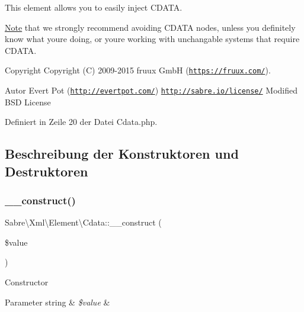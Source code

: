 This element allows you to easily inject C\+D\+A\+TA.

\mbox{\hyperlink{class_note}{Note}} that we strongly recommend avoiding C\+D\+A\+TA nodes, unless you definitely know what you\textquotesingle{}re doing, or you\textquotesingle{}re working with unchangable systems that require C\+D\+A\+TA.

\begin{DoxyCopyright}{Copyright}
Copyright (C) 2009-\/2015 fruux GmbH (\href{https://fruux.com/}{\tt https\+://fruux.\+com/}). 
\end{DoxyCopyright}
\begin{DoxyAuthor}{Autor}
Evert Pot (\href{http://evertpot.com/}{\tt http\+://evertpot.\+com/})  \href{http://sabre.io/license/}{\tt http\+://sabre.\+io/license/} Modified B\+SD License 
\end{DoxyAuthor}


Definiert in Zeile 20 der Datei Cdata.\+php.



\subsection{Beschreibung der Konstruktoren und Destruktoren}
\mbox{\label{class_sabre_1_1_xml_1_1_element_1_1_cdata_a6a902087ca527d78a10c6d00870c35c2}} 
\subsubsection{\texorpdfstring{\+\_\+\+\_\+construct()}{\_\_construct()}}
{\footnotesize\ttfamily Sabre\textbackslash{}\+Xml\textbackslash{}\+Element\textbackslash{}\+Cdata\+::\+\_\+\+\_\+construct (\begin{DoxyParamCaption}\item[{}]{\$value }\end{DoxyParamCaption})}

Constructor


\begin{DoxyParams}[1]{Parameter}
string & {\em \$value} & \\
\hline
\end{DoxyParams}


